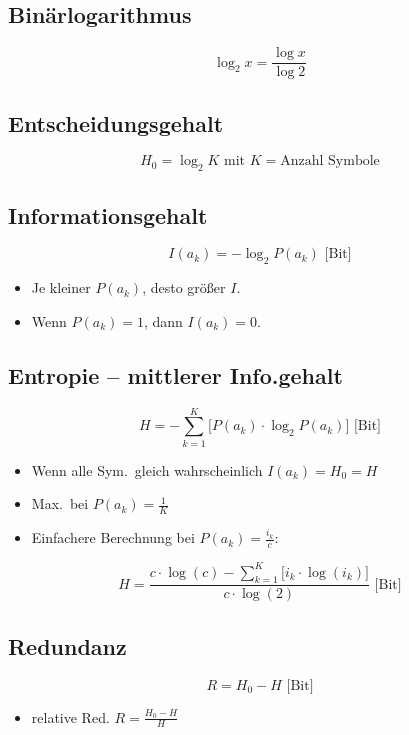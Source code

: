 \begin{multicols}{2}

\subsection*{Binärlogarithmus}
\[
    \log_2{x} = \frac{\log{x}}{\log{2}}
\]

\subsection*{Entscheidungsgehalt}
\[
    H_0 = \log_2{K} \mbox{ mit } K = \text{Anzahl Symbole}
\]

\subsection*{Informationsgehalt}
\begin{minipage}{\columnwidth}
\[
    I(a_k) = -\log_2{P(a_k)} \mbox{ [Bit]}
\]
\begin{itemize}
    \setlength{\parskip}{0pt}
    \setlength{\itemsep}{0pt}
    \item Je kleiner $P(a_k)$, desto größer $I$.
    \item Wenn $P(a_k) = 1$, dann $I(a_k) = 0$.
\end{itemize}
\end{minipage}

\subsection*{Entropie -- mittlerer Info.gehalt}
\begin{minipage}{\columnwidth}
\[
    H = - \sum_{k=1}^{K} \bigg[ P(a_k) \cdot \log_2{P(a_k)} \bigg] \mbox{ [Bit]}
\]
\begin{itemize}
    \setlength{\parskip}{0pt}
    \setlength{\itemsep}{0pt plus 1pt}
    \item Wenn alle Sym.\ gleich wahrscheinlich $I(a_k) = H_0 = H$
    \item Max.\ bei $P(a_k) = \frac{1}{K}$
    \item Einfachere Berechnung bei $P(a_k) = \frac{i_k}{c}$:
\end{itemize}
\[
    H = \frac{c \cdot \log(c) - \sum\limits_{k=1}^{K} \bigg[ i_k \cdot
        \log(i_k) \bigg]}{c \cdot \log(2)} \mbox{ [Bit]}
\]
\end{minipage}

\subsection*{Redundanz}
\begin{minipage}{\columnwidth}
\[
    R = H_0 - H \mbox{ [Bit]}
\]
\begin{itemize}
    \setlength{\parskip}{0pt}
    \setlength{\itemsep}{0pt plus 1pt}
    \item relative Red. $\displaystyle R = \frac{H_0 - H}{H}$
\end{itemize}
\end{minipage}


\end{multicols}
